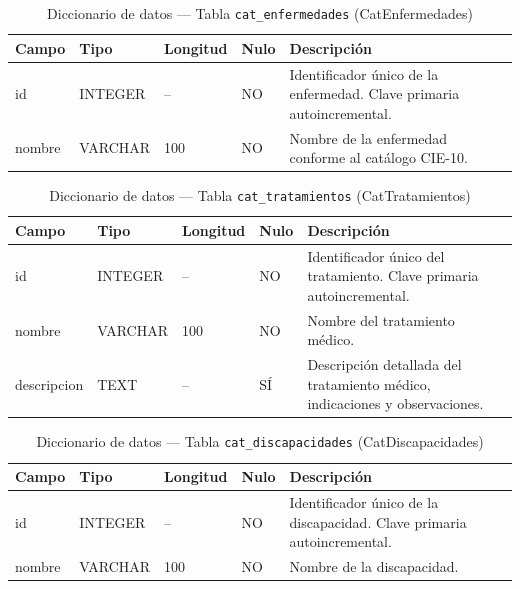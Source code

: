 \begin{table}[H]
	\centering
	\caption{Diccionario de datos --- Tabla \texttt{cat\_enfermedades} (CatEnfermedades)}
	\label{tab:data-dict-cat_enfermedades}
	\scriptsize
	\begin{tabular}{>{\ttfamily\raggedright\arraybackslash}p{3.6cm} p{1.6cm} p{1.3cm} p{0.7cm} p{5.6cm}}
		\toprule
		\textbf{Campo} & \textbf{Tipo} & \textbf{Longitud} & \textbf{Nulo} & \textbf{Descripción} \\
		\midrule
		id & INTEGER & -- & NO & Identificador único de la enfermedad. Clave primaria autoincremental. \\
		nombre & VARCHAR & 100 & NO & Nombre de la enfermedad conforme al catálogo CIE-10. \\
		\bottomrule
	\end{tabular}
\end{table}

\begin{table}[H]
	\centering
	\caption{Diccionario de datos --- Tabla \texttt{cat\_tratamientos} (CatTratamientos)}
	\label{tab:data-dict-cat_tratamientos}
	\scriptsize
	\begin{tabular}{>{\ttfamily\raggedright\arraybackslash}p{3.6cm} p{1.6cm} p{1.3cm} p{0.7cm} p{5.6cm}}
		\toprule
		\textbf{Campo} & \textbf{Tipo} & \textbf{Longitud} & \textbf{Nulo} & \textbf{Descripción} \\
		\midrule
		id & INTEGER & -- & NO & Identificador único del tratamiento. Clave primaria autoincremental. \\
		nombre & VARCHAR & 100 & NO & Nombre del tratamiento médico. \\
		descripcion & TEXT & -- & SÍ & Descripción detallada del tratamiento médico, indicaciones y observaciones. \\
		\bottomrule
	\end{tabular}
\end{table}

\begin{table}[H]
	\centering
	\caption{Diccionario de datos --- Tabla \texttt{cat\_discapacidades} (CatDiscapacidades)}
	\label{tab:data-dict-cat_discapacidades}
	\scriptsize
	\begin{tabular}{>{\ttfamily\raggedright\arraybackslash}p{3.6cm} p{1.6cm} p{1.3cm} p{0.7cm} p{5.6cm}}
		\toprule
		\textbf{Campo} & \textbf{Tipo} & \textbf{Longitud} & \textbf{Nulo} & \textbf{Descripción} \\
		\midrule
		id & INTEGER & -- & NO & Identificador único de la discapacidad. Clave primaria autoincremental. \\
		nombre & VARCHAR & 100 & NO & Nombre de la discapacidad. \\
		\bottomrule
	\end{tabular}
\end{table}

